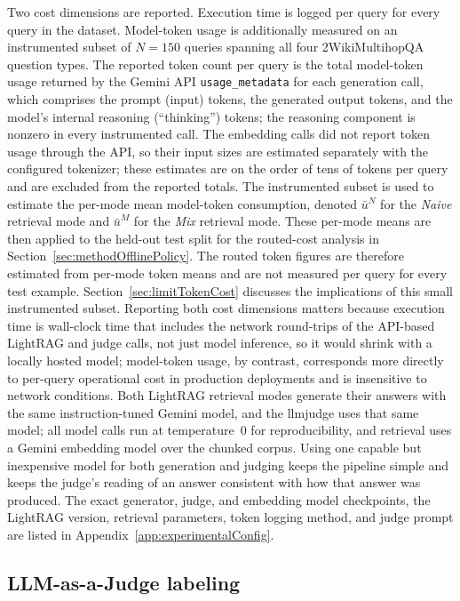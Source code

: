 \documentclass[english, bibtex]{kththesis}               %
\numberwithin{listing}{chapter}
\begin{document}
Two cost dimensions are reported. Execution time is logged per query for every query in the dataset. Model-token usage is additionally measured on an instrumented subset of \(N = 150\) queries spanning all four 2WikiMultihopQA question types. The reported token count per query is the total model-token usage returned by the Gemini API \texttt{usage\_metadata} for each generation call, which comprises the prompt (input) tokens, the generated output tokens, and the model's internal reasoning (``thinking'') tokens; the reasoning component is nonzero in every instrumented call. The embedding calls did not report token usage through the API, so their input sizes are estimated separately with the configured tokenizer; these estimates are on the order of tens of tokens per query and are excluded from the reported totals. The instrumented subset is used to estimate the per-mode mean model-token consumption, denoted $\bar{u}^N$ for the \emph{Naive} retrieval mode and $\bar{u}^M$ for the \emph{Mix} retrieval mode. These per-mode means are then applied to the held-out test split for the routed-cost analysis in Section~\ref{sec:methodOfflinePolicy}. The routed token figures are therefore estimated from per-mode token means and are not measured per query for every test example. Section~\ref{sec:limitTokenCost} discusses the implications of this small instrumented subset. Reporting both cost dimensions matters because execution time is wall-clock time that includes the network round-trips of the API-based LightRAG and judge calls, not just model inference, so it would shrink with a locally hosted model; model-token usage, by contrast, corresponds more directly to per-query operational cost in production deployments and is insensitive to network conditions. Both LightRAG retrieval modes generate their answers with the same instruction-tuned Gemini model, and the \gls{llmjudge} uses that same model; all model calls run at temperature~$0$ for reproducibility, and retrieval uses a Gemini embedding model over the chunked corpus. Using one capable but inexpensive model for both generation and judging keeps the pipeline simple and keeps the judge's reading of an answer consistent with how that answer was produced. The exact generator, judge, and embedding model checkpoints, the LightRAG version, retrieval parameters, token logging method, and judge prompt are listed in Appendix~\ref{app:experimentalConfig}.

\subsection{LLM-as-a-Judge labeling}
\label{sec:methodJudge}
\end{document}
